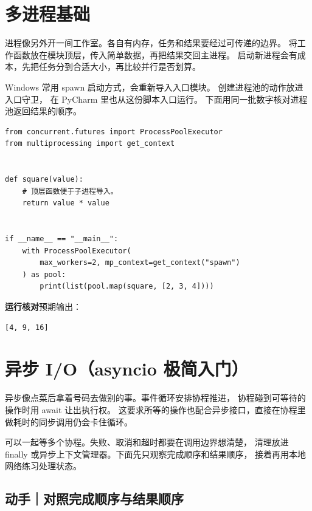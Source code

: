\par


\section{多进程基础}

进程像另外开一间工作室。各自有内存，任务和结果要经过可传递的边界。
将工作函数放在模块顶层，传入简单数据，再把结果交回主进程。
启动新进程会有成本，先把任务分到合适大小，再比较并行是否划算。

Windows 常用 spawn 启动方式，会重新导入入口模块。
创建进程池的动作放进入口守卫，
在 PyCharm 里也从这份脚本入口运行。
下面用同一批数字核对进程池返回结果的顺序。


\begin{lstlisting}[title={\code{process_squares.py}}]
from concurrent.futures import ProcessPoolExecutor
from multiprocessing import get_context


def square(value):
    # 顶层函数便于子进程导入。
    return value * value


if __name__ == "__main__":
    with ProcessPoolExecutor(
        max_workers=2, mp_context=get_context("spawn")
    ) as pool:
        print(list(pool.map(square, [2, 3, 4])))
\end{lstlisting}


\textbf{运行核对}\enspace 预期输出：
\begin{lstlisting}[language={},numbers=none]
[4, 9, 16]
\end{lstlisting}

\par


\section[异步 I/O]{异步 I/O（asyncio 极简入门）}

异步像点菜后拿着号码去做别的事。事件循环安排协程推进，
协程碰到可等待的操作时用 await 让出执行权。
这要求所等的操作也配合异步接口，直接在协程里做耗时的同步调用仍会卡住循环。

 可以一起等多个协程。失败、取消和超时都要在调用边界想清楚，
清理放进 finally 或异步上下文管理器。下面先只观察完成顺序和结果顺序，
接着再用本地网络练习处理状态。

\subsection*{动手｜对照完成顺序与结果顺序}

